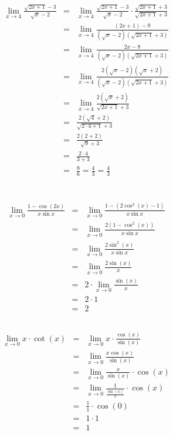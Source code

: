 \documentclass{article}
\begin{document}
\[
\begin{array}{rcl}
	\lim_{x \to 4} \frac{\sqrt{2x+1}-3}{\sqrt{x}-2} 
	& = & \lim_{x \to 4} \frac{\sqrt{2x+1}-3}{\sqrt{x}-2} \cdot \frac{\sqrt{2x+1}+3}{\sqrt{2x+1}+3} \\ 
	& = & \lim_{x \to 4} \frac{(2x+1) - 9}{(\sqrt{x}-2)(\sqrt{2x+1}+3)} \\ 
	& = & \lim_{x \to 4} \frac{2x - 8}{(\sqrt{x}-2)(\sqrt{2x+1}+3)} \\ 
	& = & \lim_{x \to 4} \frac{2(\sqrt{x}-2)(\sqrt{x}+2)}{(\sqrt{x}-2)(\sqrt{2x+1}+3)} \\ 
	& = & \lim_{x \to 4} \frac{2(\sqrt{x}+2)}{\sqrt{2x+1}+3} \\ 
	& = & \frac{2(\sqrt{4}+2)}{\sqrt{2 \cdot 4 + 1}+3} \\ 
	& = & \frac{2(2+2)}{\sqrt{9}+3} \\ 
	& = & \frac{2 \cdot 4}{3 + 3} \\ 
	& = & \frac{8}{6} = \frac{4}{3} = \boxed{\frac{4}{3}}
\end{array}
\]


			\section{}
			
						\subsection{}
\[
\begin{array}{rcl}
	\lim_{x \to 0} \frac{1 - \cos(2x)}{x \sin x} 
	& = & \lim_{x \to 0} \frac{1 - (2\cos^2(x) - 1)}{x \sin x} \\ 
	& = & \lim_{x \to 0} \frac{2(1 - \cos^2(x))}{x \sin x} \\ 
	& = & \lim_{x \to 0} \frac{2\sin^2(x)}{x \sin x} \\ 
	& = & \lim_{x \to 0} \frac{2\sin(x)}{x} \\ 
	& = & 2 \cdot \lim_{x \to 0} \frac{\sin(x)}{x} \\ 
	& = & 2 \cdot 1 \\ 
	& = & 2
\end{array}
\]



						\subsection{}
\[
\begin{array}{rcl}
	\lim_{x \to 0} x \cdot \cot(x) 
	& = & \lim_{x \to 0} x \cdot \frac{\cos(x)}{\sin(x)} \\ 
	& = & \lim_{x \to 0} \frac{x \cos(x)}{\sin(x)} \\ 
	& = & \lim_{x \to 0} \frac{x}{\sin(x)} \cdot \cos(x) \\ 
	& = & \lim_{x \to 0} \frac{1}{\frac{\sin(x)}{x}} \cdot \cos(x) \\ 
	& = & \frac{1}{1} \cdot \cos(0) \\ 
	& = & 1 \cdot 1 \\ 
	& = & 1
\end{array}
\]
\end{document}

